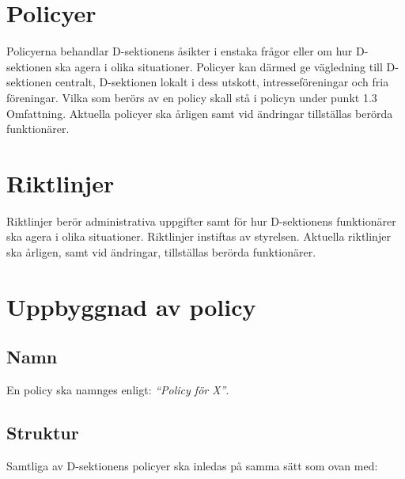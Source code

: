 \documentclass[]{dsekprotokoll}
\begin{document}
\section{Policyer}
Policyerna behandlar D-sektionens åsikter i enstaka frågor eller om hur D-sektionen ska agera i olika situationer. Policyer kan därmed ge vägledning till D-sektionen centralt, D-sektionen lokalt i dess
utskott, intresseföreningar och fria föreningar. Vilka som berörs av en policy skall stå i policyn under punkt 1.3 Omfattning. Aktuella policyer ska årligen samt vid ändringar tillställas berörda funktionärer.

\section{Riktlinjer}
Riktlinjer berör administrativa uppgifter samt för hur D-sektionens funktionärer ska agera i olika situationer. Riktlinjer instiftas av styrelsen. Aktuella riktlinjer ska årligen, samt vid ändringar, tillställas berörda funktionärer.

\section{Uppbyggnad av policy}

\subsection{Namn}

En policy ska namnges enligt: \textit{``Policy för X''}.

\subsection{Struktur}

Samtliga av D-sektionens policyer ska inledas på samma sätt som ovan med:
\end{document}
